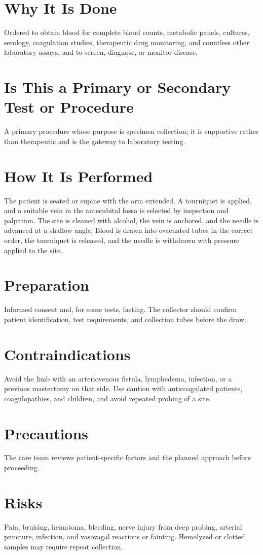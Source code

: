 \section*{Why It Is Done}
Ordered to obtain blood for complete blood counts, metabolic panels, cultures, serology, coagulation studies, therapeutic drug monitoring, and countless other laboratory assays, and to screen, diagnose, or monitor disease.
\section*{Is This a Primary or Secondary Test or Procedure}
A primary procedure whose purpose is specimen collection; it is supportive rather than therapeutic and is the gateway to laboratory testing.
\section*{How It Is Performed}
The patient is seated or supine with the arm extended. A tourniquet is applied, and a suitable vein in the antecubital fossa is selected by inspection and palpation. The site is cleaned with alcohol, the vein is anchored, and the needle is advanced at a shallow angle. Blood is drawn into evacuated tubes in the correct order, the tourniquet is released, and the needle is withdrawn with pressure applied to the site.
\section*{Preparation}
Informed consent and, for some tests, fasting. The collector should confirm patient identification, test requirements, and collection tubes before the draw.
\section*{Contraindications}
Avoid the limb with an arteriovenous fistula, lymphedema, infection, or a previous mastectomy on that side. Use caution with anticoagulated patients, coagulopathies, and children, and avoid repeated probing of a site.

\section*{Precautions}
The care team reviews patient-specific factors and the planned approach before proceeding.

\section*{Risks}
Pain, bruising, hematoma, bleeding, nerve injury from deep probing, arterial puncture, infection, and vasovagal reactions or fainting. Hemolyzed or clotted samples may require repeat collection.

